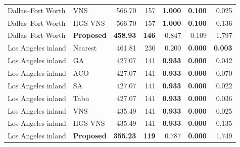 \begin{table}[H]
\begin{tabular}{@{}llrrrrr@{}}
Dallas--Fort Worth & VNS & 566.70 & 157 & \textbf{1.000} & \textbf{0.100} & 0.025 \\

Dallas--Fort Worth & HGS-VNS & 566.70 & 157 & \textbf{1.000} & \textbf{0.100} & 0.136 \\
\rowcolor{gray!10}
Dallas--Fort Worth & \textbf{Proposed} & \textbf{458.93} & \textbf{146} & 0.847 & 0.109 & 1.797 \\
\addlinespace[2pt]

Los Angeles inland & Nearest & 461.81 & 230 & 0.200 & \textbf{0.000} & \textbf{0.003} \\

Los Angeles inland & GA & 427.07 & 141 & \textbf{0.933} & \textbf{0.000} & 0.042 \\

Los Angeles inland & ACO & 427.07 & 141 & \textbf{0.933} & \textbf{0.000} & 0.070 \\

Los Angeles inland & SA & 427.07 & 141 & \textbf{0.933} & \textbf{0.000} & 0.022 \\

Los Angeles inland & Tabu & 427.07 & 141 & \textbf{0.933} & \textbf{0.000} & 0.036 \\

Los Angeles inland & VNS & 435.49 & 141 & \textbf{0.933} & \textbf{0.000} & 0.025 \\

Los Angeles inland & HGS-VNS & 435.49 & 141 & \textbf{0.933} & \textbf{0.000} & 0.135 \\
\rowcolor{gray!10}
Los Angeles inland & \textbf{Proposed} & \textbf{355.23} & \textbf{119} & 0.787 & \textbf{0.000} & 1.749 \\
\bottomrule
\end{tabular}
\end{table}
